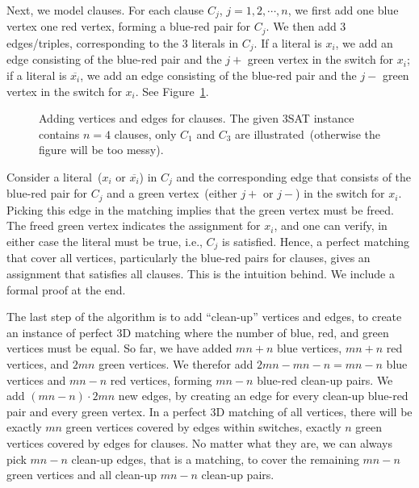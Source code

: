Next, we model clauses. For each clause $C_j$, $j=1,2,\cdots,n$, we first add one blue vertex one red vertex, forming a blue-red 
pair for $C_j$.
We then add 3 edges/triples, corresponding to the 3 literals in $C_j$.
If a literal is $x_i$, we add an edge consisting of the blue-red pair and the $j+$ green vertex in the switch for $x_i$;
if a literal is $\overline{x_i}$, we add an edge consisting of the blue-red pair and the $j-$ green vertex in the switch for $x_i$.
See Figure~\ref{fig:3dclauses}.

\begin{figure}[!h]
\centering{}
\caption{Adding vertices and edges for clauses.
The given 3SAT instance contains $n=4$ clauses, only $C_1$ and $C_3$ are illustrated~(otherwise the figure will be too messy).}
\label{fig:3dclauses}
\end{figure}

Consider a literal~($x_i$ or $\overline{x_i}$) in $C_j$ and the corresponding
edge that consists of the blue-red pair for $C_j$ and a green vertex~(either $j+$ or $j-$) in the switch for $x_i$.
Picking this edge in the matching implies that the green vertex must be freed. The freed green vertex indicates
the assignment for $x_i$, and one can verify, in either case the literal must be true, i.e., $C_j$ is satisfied.
Hence, a perfect matching that cover all vertices, particularly the blue-red pairs for clauses, gives an assignment
that satisfies all clauses. This is the intuition behind. We include a formal proof at the end.



The last step of the algorithm is to add ``clean-up'' vertices and edges, to create an instance of perfect 3D matching where the number
of blue, red, and green vertices must be equal. So far, we have added $mn+n$ blue vertices, $mn+n$ red vertices,
and $2mn$ green vertices. We therefor add $2mn-mn-n=mn-n$ blue vertices and $mn-n$ red vertices, forming $mn-n$ blue-red clean-up pairs.
We add $(mn-n)\cdot 2mn$ new edges, by creating an edge for every clean-up blue-red pair and every green vertex.
In a perfect 3D matching of all vertices, there will be exactly $mn$ green vertices covered by edges within switches,
exactly $n$ green vertices covered by edges for clauses.
No matter what they are, we can always pick $mn-n$ clean-up edges, that is a matching, to cover the remaining $mn-n$ green vertices
and all clean-up $mn-n$ clean-up pairs.

